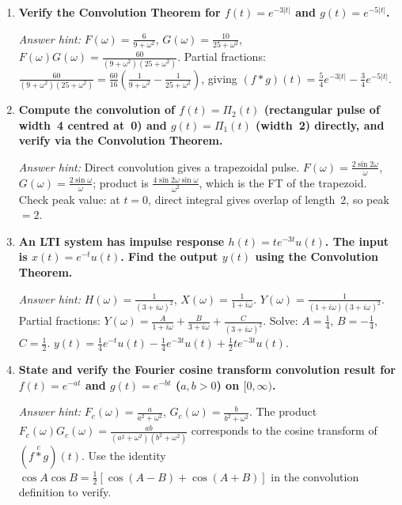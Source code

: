 \documentclass[12pt,a4paper]{article}
\begin{document}
\begin{enumerate}[label=\textbf{P\arabic*.}, leftmargin=*, itemsep=8pt]

\item \textbf{Verify the Convolution Theorem for $f(t)=e^{-3|t|}$ and $g(t)=e^{-5|t|}$.}

  \textit{Answer hint:}
  $F(\omega)=\frac{6}{9+\omega^2}$, $G(\omega)=\frac{10}{25+\omega^2}$,
  $F(\omega)G(\omega)=\frac{60}{(9+\omega^2)(25+\omega^2)}$.
  Partial fractions: $\frac{60}{(9+\omega^2)(25+\omega^2)} =
  \frac{60}{16}\!\left(\frac{1}{9+\omega^2}-\frac{1}{25+\omega^2}\right)$,
  giving $(f*g)(t)=\frac{5}{4}e^{-3|t|}-\frac{3}{4}e^{-5|t|}$.

\item \textbf{Compute the convolution of $f(t)=\Pi_2(t)$ (rectangular pulse of width~4
  centred at~0) and $g(t)=\Pi_1(t)$ (width~2) directly, and verify via the
  Convolution Theorem.}

  \textit{Answer hint:} Direct convolution gives a trapezoidal pulse.
  $F(\omega) = \frac{2\sin 2\omega}{\omega}$, $G(\omega)=\frac{2\sin\omega}{\omega}$;
  product is $\frac{4\sin 2\omega\sin\omega}{\omega^2}$, which is the FT of the
  trapezoid. Check peak value: at $t=0$, direct integral gives overlap of
  length~2, so peak $= 2$.

\item \textbf{An LTI system has impulse response $h(t)=te^{-3t}u(t)$. The input is
  $x(t)=e^{-t}u(t)$. Find the output $y(t)$ using the Convolution Theorem.}

  \textit{Answer hint:} $H(\omega)=\frac{1}{(3+i\omega)^2}$,
  $X(\omega)=\frac{1}{1+i\omega}$.
  $Y(\omega)=\frac{1}{(1+i\omega)(3+i\omega)^2}$.
  Partial fractions: $Y(\omega)=\frac{A}{1+i\omega}+\frac{B}{3+i\omega}
  +\frac{C}{(3+i\omega)^2}$.
  Solve: $A=\frac{1}{4}$, $B=-\frac{1}{4}$, $C=\frac{1}{2}$.
  $y(t)=\frac{1}{4}e^{-t}u(t)-\frac{1}{4}e^{-3t}u(t)+\frac{1}{2}te^{-3t}u(t)$.

\item \textbf{State and verify the Fourier cosine transform convolution result for
  $f(t)=e^{-at}$ and $g(t)=e^{-bt}$ ($a,b>0$) on $[0,\infty)$.}

  \textit{Answer hint:} $F_c(\omega)=\frac{a}{a^2+\omega^2}$,
  $G_c(\omega)=\frac{b}{b^2+\omega^2}$.
  The product $F_c(\omega)G_c(\omega)=\frac{ab}{(a^2+\omega^2)(b^2+\omega^2)}$
  corresponds to the cosine transform of $(f\stackrel{c}{*}g)(t)$.
  Use the identity $\cos A \cos B = \frac{1}{2}[\cos(A-B)+\cos(A+B)]$ in the
  convolution definition to verify.


\end{enumerate}
\end{document}
